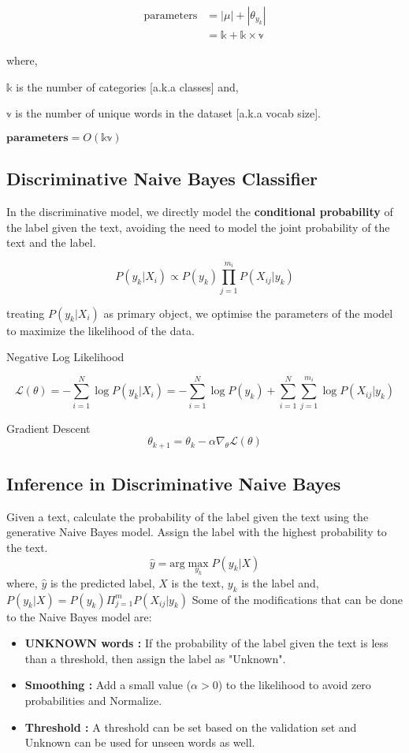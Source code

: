 \begin{align*}
	\text{parameters} &= |\mu| + |\theta_{y_k}| \\
	&= \mathbb{k} + \mathbb{k} \times \mathbb{v}
\end{align*}

\noindent where,

$\mathbb{k}$ is the number of categories [a.k.a classes] and,

$\mathbb{v}$ is the number of unique words in the dataset [a.k.a vocab size].

\vspace{0.5cm}

$\textbf{parameters} = O(\mathbb{k} \mathbb{v})$

\vspace{0.5cm}


\subsection{Discriminative Naive Bayes Classifier}
In the discriminative model, we directly model the {\bf conditional probability} of the label given the text, avoiding the need to model the joint probability of the text and the label.

$$
	P(y_k|X_i) \propto P(y_k) \prod_{j=1}^{m_i} P(X_{ij}| y_k) 
$$

treating $P(y_k|X_i)$ as primary object, we optimise the parameters of the model to maximize the likelihood of the data.

 Negative Log Likelihood

$$
	\mathcal{L(\theta)} = - \sum_{i=1}^{N} \log P(y_k|X_i) = - \sum_{i=1}^{N} \log P(y_k) + \sum_{i=1}^{N} \sum_{j=1}^{m_i} \log P(X_{ij}| y_k)
$$

 Gradient Descent
$$
	\theta_{k+1} = \theta_k - \alpha \nabla_{\theta} \mathcal{L}(\theta) 
$$

\subsection*{Inference in Discriminative Naive Bayes}
Given a text, calculate the probability of the label given the text using the generative Naive Bayes model.
Assign the label with the highest probability to the text.
	$$
		\hat{y} = \text{arg} \max_{y_k} P(y_k|X)
	$$
	where, $\hat{y}$ is the predicted label, $X$ is the text, $y_k$ is the label and, $ \displaystyle P(y_k | X) = P(y_k) \Pi_{j = 1}^{m} P(X_{ij} | y_k)$
\vspace{0.5cm}
\noindent Some of the modifications that can be done to the Naive Bayes model are:
\begin{itemize}
	\item {\bf UNKNOWN words :} If the probability of the label given the text is less than a threshold, then assign the label as "Unknown".
	\item {\bf Smoothing :} Add a small value ($\alpha > 0$) to the likelihood to avoid zero probabilities and Normalize. 
	\item {\bf Threshold : } A threshold can be set based on the validation set and Unknown can be used for unseen words as well.
\end{itemize}

